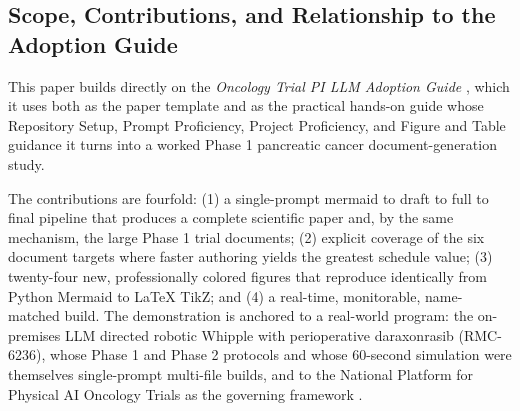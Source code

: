 \subsection{Scope, Contributions, and Relationship to the Adoption Guide}

This paper builds directly on the \emph{Oncology Trial PI LLM Adoption Guide}
\cite{adoptionguide}, which it uses both as the paper template and as the practical
hands-on guide whose Repository Setup, Prompt Proficiency, Project Proficiency, and
Figure and Table guidance it turns into a worked Phase 1 pancreatic cancer document-generation
study.

The contributions are fourfold: (1) a single-prompt mermaid to draft to full
to final pipeline that produces a complete scientific paper and, by the same
mechanism, the large Phase 1 trial documents; (2) explicit coverage of the six
document targets where faster authoring yields the greatest schedule value; (3)
twenty-four new, professionally colored figures that reproduce identically from
Python Mermaid to LaTeX TikZ; and (4) a real-time, monitorable, name-matched build.
The demonstration is anchored to a real-world program: the on-premises LLM directed
robotic Whipple with perioperative daraxonrasib (RMC-6236), whose Phase 1
\cite{phase1protocol} and Phase 2 \cite{phase2protocol} protocols and whose
60-second simulation \cite{kawchak_2026_20196639} were themselves single-prompt
multi-file builds, and to the National Platform for Physical AI Oncology Trials as
the governing framework \cite{natplatform}.
